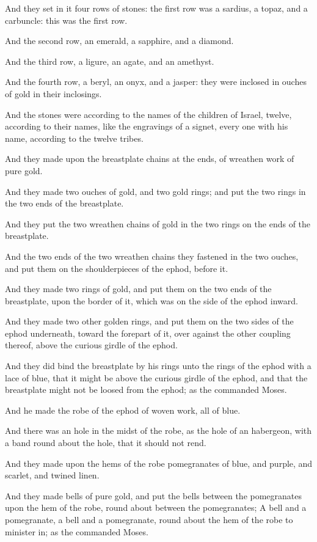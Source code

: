 \Verse And they set in it four rows of stones: the first row was a sardius, a topaz, and a carbuncle: this was the first row.

\Verse And the second row, an emerald, a sapphire, and a diamond.

\Verse And the third row, a ligure, an agate, and an amethyst.

\Verse And the fourth row, a beryl, an onyx, and a jasper: they were inclosed in ouches of gold in their inclosings.

\Verse And the stones were according to the names of the children of Israel, twelve, according to their names, like the engravings of a signet, every one with his name, according to the twelve tribes.

\Verse And they made upon the breastplate chains at the ends, of wreathen work of pure gold.

\Verse And they made two ouches of gold, and two gold rings; and put the two rings in the two ends of the breastplate.

\Verse And they put the two wreathen chains of gold in the two rings on the ends of the breastplate.

\Verse And the two ends of the two wreathen chains they fastened in the two ouches, and put them on the shoulderpieces of the ephod, before it.

\Verse And they made two rings of gold, and put them on the two ends of the breastplate, upon the border of it, which was on the side of the ephod inward.

\Verse And they made two other golden rings, and put them on the two sides of the ephod underneath, toward the forepart of it, over against the other coupling thereof, above the curious girdle of the ephod.

\Verse And they did bind the breastplate by his rings unto the rings of the ephod with a lace of blue, that it might be above the curious girdle of the ephod, and that the breastplate might not be loosed from the ephod; as the \LORD commanded Moses.

\Verse And he made the robe of the ephod of woven work, all of blue.

\Verse And there was an hole in the midst of the robe, as the hole of an habergeon, with a band round about the hole, that it should not rend.

\Verse And they made upon the hems of the robe pomegranates of blue, and purple, and scarlet, and twined linen.

\Verse And they made bells of pure gold, and put the bells between the pomegranates upon the hem of the robe, round about between the pomegranates; \Verse A bell and a pomegranate, a bell and a pomegranate, round about the hem of the robe to minister in; as the \LORD commanded Moses.

